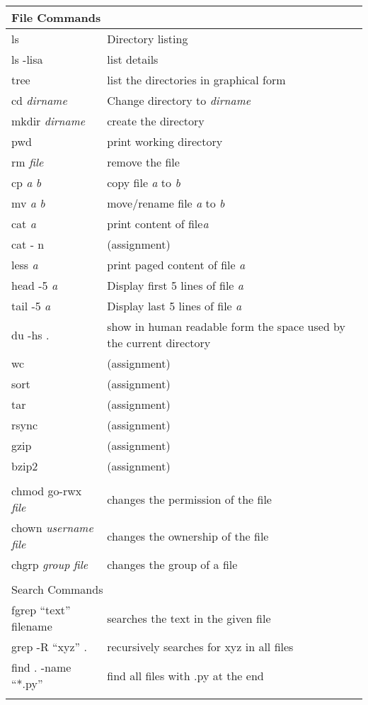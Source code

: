 \begin{center}
\begin{longtable}{|p{4cm}|p{8cm}|}
  \hline
  \multicolumn{2}{|l|}{\cellcolor{blue!15} File Commands}\\
  \hline
  ls & Directory listing\\
  ls -lisa & list details \\
  tree & list the directories in graphical form \\
  cd \emph{dirname} & Change directory to \emph{dirname} \\
  mkdir \emph{dirname} & create the directory \\
  pwd & print working directory \\
  rm \emph{file} & remove the file \\
  cp \emph{a} \emph{b} & copy file \emph{a} to \emph{b} \\
  mv \emph{a} \emph{b} & move/rename file \emph{a} to \emph{b}\\
  cat \emph{a} & print content of file\emph{a}\\
  cat - n &  (assignment) \\
  less \emph{a} & print paged content of file \emph{a}\\
  head -5 \emph{a} & Display first 5 lines of file \emph{a}\\
  tail -5 \emph{a} & Display last 5 lines of file \emph{a}\\
  du -hs . & show in human readable form the space used by the current
             directory\\
  wc &  (assignment) \\
  sort &  (assignment) \\
  tar &  (assignment) \\
  rsync &  (assignment) \\
  gzip &  (assignment) \\
  bzip2 &  (assignment) \\
  & \\
  
  chmod go-rwx {\em file} & changes the permission of the file \\
  chown {\em username} {\em file} & changes the ownership of the file \\
  chgrp {\em group} {\em file} & changes the group of a file\\
  & \\

  \hline
  \multicolumn{2}{|l|}{\cellcolor{blue!15} Search Commands}\\
  \hline
  fgrep ``text'' filename &  searches the text in the given file \\
  grep -R ``xyz'' . & recursively searches for xyz in all files \\
  find . -name ``*.py'' &  find all files with .py at the end \\
  & \\


\end{longtable}
\end{center}
